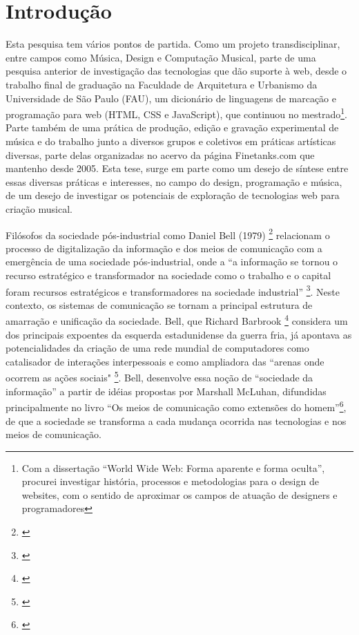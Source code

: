 

\chapter*{Introdução}
\label{ch:intro}

Esta pesquisa tem vários pontos de partida. Como um projeto transdisciplinar, entre campos como Música, Design e Computação Musical, parte de uma pesquisa anterior de investigação das tecnologias que dão suporte à web, desde o trabalho final de graduação na Faculdade de Arquitetura e Urbanismo da Universidade de São Paulo (FAU), um dicionário de linguagens de marcação e programação para web (HTML, CSS e JavaScript), que continuou no mestrado\footnote{Com a dissertação ``World Wide Web: Forma aparente e forma oculta'', procurei investigar história, processos e metodologias para o design de websites, com o sentido de aproximar os campos de atuação de designers e programadores}. Parte também de uma prática de produção, edição e gravação experimental de música e do trabalho junto a diversos grupos e coletivos em  práticas artísticas diversas, parte delas organizadas no acervo da página Finetanks.com que mantenho desde 2005.  
    Esta tese, surge em parte como um desejo de síntese entre essas diversas práticas e interesses, no campo do design, programação e música, de um desejo de investigar os potenciais de exploração de tecnologias web para criação musical. 
    
    
    Filósofos da sociedade pós-industrial como Daniel Bell (1979) \footnote{\cite{bell1979thinking}} relacionam o processo de digitalização da informação e dos meios de comunicação com a emergência de uma sociedade pós-industrial, onde a ``a informação se tornou o recurso estratégico e transformador na sociedade como o trabalho e o capital foram recursos estratégicos e transformadores na sociedade industrial'' \footnote{\cite[26]{bell1979thinking}}. Neste contexto, os sistemas de comunicação se tornam a principal estrutura de amarração e unificação da sociedade. Bell, que Richard Barbrook \footnote{\cite{barbrook1999cyber}} considera um dos principais expoentes da esquerda estadunidense da guerra fria, já apontava as potencialidades da criação de uma rede mundial de computadores como catalisador de interações interpessoais e como ampliadora das ``arenas onde ocorrem as ações sociais" \footnote{\cite[22]{bell1979thinking}}. Bell, desenvolve essa noção de ``sociedade da informação'' a partir de idéias propostas por Marshall McLuhan, difundidas principalmente no livro ``Os meios de comunicação como extensões do homem''\footnote{\cite{luhan1964marshall}}, de que a sociedade se  transforma a cada mudança ocorrida nas tecnologias e nos meios de comunicação. 
    
